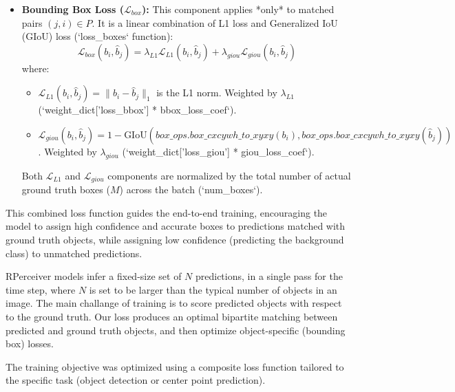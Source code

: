 \begin{itemize}
\begin{itemize}
    \item \textbf{Bounding Box Loss ($ \mathcal{L}_{box} $):} This component applies *only* to matched pairs $ (j, i) \in P $. It is a linear combination of L1 loss and Generalized IoU (GIoU) loss (`loss_boxes` function):
    \begin{equation}
        \mathcal{L}_{box}(b_i, \hat{b}_j) = \lambda_{L1} \mathcal{L}_{L1}(b_i, \hat{b}_j) + \lambda_{giou} \mathcal{L}_{giou}(b_i, \hat{b}_j)
        \label{eq:box_loss_revised}
    \end{equation}
    where:
        \begin{itemize}
            \item $ \mathcal{L}_{L1}(b_i, \hat{b}_j) = \|b_i - \hat{b}_j\|_1 $ is the L1 norm. Weighted by $ \lambda_{L1} $ (`weight_dict['loss_bbox'] * bbox_loss_coef`).
            \item $ \mathcal{L}_{giou}(b_i, \hat{b}_j) = 1 - \text{GIoU}(box\_ops.box\_cxcywh\_to\_xyxy(b_i), box\_ops.box\_cxcywh\_to\_xyxy(\hat{b}_j)) $. Weighted by $ \lambda_{giou} $ (`weight_dict['loss_giou'] * giou_loss_coef`).
        \end{itemize}
        Both $ \mathcal{L}_{L1} $ and $ \mathcal{L}_{giou} $ components are normalized by the total number of actual ground truth boxes ($M$) across the batch (`num_boxes`).
\end{itemize}
This combined loss function guides the end-to-end training, encouraging the model to assign high confidence and accurate boxes to predictions matched with ground truth objects, while assigning low confidence (predicting the background class) to unmatched predictions.



RPerceiver models infer a fixed-size set of $N$ predictions, in a single pass for the time step, where $N$ is set to be larger than the typical number of objects in an image. The main challange of training is to score predicted objects with respect to the ground truth. Our loss produces an optimal bipartite matching between predicted and ground truth objects, and then optimize object-specific (bounding box) losses.

The training objective was optimized using a composite loss function tailored to the specific task (object detection or center point prediction).


\end{itemize}
